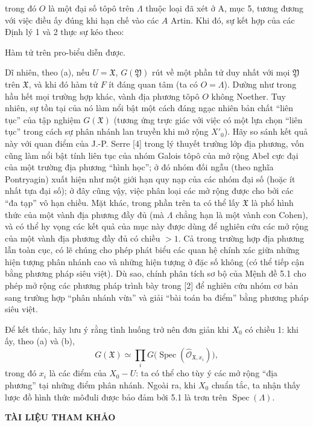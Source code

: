 trong đó $O$ là một đại số tôpô trên $\Lambda$ thuộc loại đã xét ở A, mục 5,
tương đương với việc điều ấy đúng khi hạn chế vào các $A$ Artin. Khi đó, sự kết
hợp của các Định lý 1 và 2 thực sự kéo theo:

 Hàm tử trên pro-biểu diễn được.

Dĩ nhiên, theo (a), nếu $U=\mathfrak X$, $G(\mathfrak Y)$ rút về một phần tử
duy nhất với mọi $\mathfrak Y$ trên $\mathfrak X$, và khi đó hàm tử $F$ ít
đáng quan tâm (ta có $O=\Lambda$). Dường như trong hầu hết mọi trường hợp khác,
vành địa phương tôpô $O$ không Noether. Tuy nhiên, sự tồn tại của nó làm nổi
bật một cách đáng ngạc nhiên bản chất ``liên tục'' của tập nghiệm
$G(\mathfrak X)$ (tương ứng trực giác với việc có một lựa chọn ``liên tục''
trong cách sự phân nhánh lan truyền khi mở rộng $X'_0$). Hãy so sánh kết quả
này với quan điểm của J.-P. Serre [4] trong lý thuyết trường lớp địa phương,
vốn cũng làm nổi bật tính liên tục của nhóm Galois tôpô của mở rộng Abel cực
đại của một trường địa phương ``hình học''; ở đó nhóm đối ngẫu (theo nghĩa
Pontryagin) xuất hiện như một giới hạn quy nạp của các nhóm đại số (hoặc ít
nhất tựa đại số); ở đây cũng vậy, việc phân loại các mở rộng được cho bởi các
``đa tạp'' vô hạn chiều. Mặt khác, trong phần trên ta có thể lấy
$\mathfrak X$ là phổ hình thức của một vành địa phương đầy đủ (mà $\Lambda$
chẳng hạn là một vành con Cohen), và có thể hy vọng các kết quả của mục này
được dùng để nghiên cứu các mở rộng của một vành địa phương đầy đủ có chiều
$>1$. Cả trong trường hợp địa phương lẫn toàn cục, có lẽ chúng cho phép phát
biểu các quan hệ chính xác giữa những hiện tượng phân nhánh cao và những hiện
tượng ở đặc số không (có thể tiếp cận bằng phương pháp siêu việt). Dù sao,
chính phân tích sơ bộ của Mệnh đề 5.1 cho phép mở rộng các phương pháp trình
bày trong [2] để nghiên cứu nhóm cơ bản sang trường hợp ``phân nhánh vừa'' và
giải ``bài toán ba điểm'' bằng phương pháp siêu việt.

Để kết thúc, hãy lưu ý rằng tình huống trở nên đơn giản khi $X_0$ có chiều 1:
khi ấy, theo (a) và (b),
\[
  G(\mathfrak X)\simeq
  \prod_iG\bigl(\operatorname{Spec}(\widehat{\mathcal O}_{\mathfrak X,x_i})\bigr),
\]
trong đó $x_i$ là các điểm của $X_0-U$: ta có thể cho tùy ý các mở rộng ``địa
phương'' tại những điểm phân nhánh. Ngoài ra, khi $X_0$ chuẩn tắc, ta nhận thấy
lược đồ hình thức môđuli được bảo đảm bởi 5.1 là trơn trên
$\operatorname{Spec}(\Lambda)$.

\begin{center}
  \textbf{TÀI LIỆU THAM KHẢO}
\end{center}

